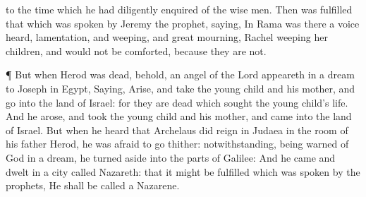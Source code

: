 {to the
time
which he had diligently
enquired
of the wise
men.
Then was
fulfilled that which was
spoken
by
Jeremy the
prophet,
saying,
In
Rama was
there a
voice
heard,
lamentation,
and
weeping,
and
great
mourning,
Rachel
weeping
{}
her
children,
and
would
not be
comforted,
because they
are
not.
\par }{\PP {}¶ But
when
Herod was
dead,
behold, an
angel of the
Lord
appeareth
in a
dream to
Joseph
in
Egypt,
Saying,
Arise, and
take the young
child
and
his
mother,
and
go
into the
land of
Israel:
for they are
dead
which
sought the young
child’s
life.
And he
arose, and
took the young
child
and
his
mother,
and
came
into the
land of
Israel.
But when he
heard
that
Archelaus did
reign
in
Judaea in the room
of
his
father
Herod, he was
afraid to
go
thither:
notwithstanding, being warned of
God
in a
dream, he turned
aside
into the
parts of
Galilee:
And he
came and
dwelt
in a
city
called
Nazareth:
that it might be
fulfilled
which was
spoken
by the
prophets, He shall be
called a
Nazarene.

}
